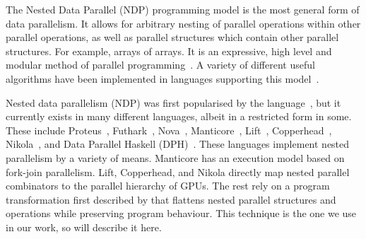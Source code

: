 
The Nested Data Parallel (NDP) programming model is the most general form of data parallelism. It allows for arbitrary nesting of parallel operations within other parallel operations, as well as parallel structures which contain other parallel structures. For example, arrays of arrays. It is an expressive, high level and modular method of parallel programming~\cite{Blelloch:1990vl}. A variety of different useful algorithms have been implemented in languages supporting this model~\cite{Blelloch:nbody94,Blelloch:delaunay96,Blelloch:connected94}.

Nested data parallelism (NDP) was first popularised by the \nesl{} language~\cite{Blelloch:nesl1995}, but it currently exists in many different languages, albeit in a restricted form in some. These include Proteus~\cite{proteus-frontiers95}, Futhark~\cite{Henriksen:2017futhark}, Nova~\cite{collins2013nova}, Manticore~\cite{Fluet:2007:manticore}, Lift~\cite{Steuwer:lift}, Copperhead~\cite{Catanzaro:copperhead}, Nikola~\cite{Mainland:nikola}, and Data Parallel Haskell (DPH)~\cite{Jones:2008uu}. These languages implement nested parallelism by a variety of means. Manticore has an execution model based on fork-join parallelism. Lift, Copperhead, and Nikola directly map nested parallel combinators to the parallel hierarchy of GPUs. The rest rely on a program transformation first described by \citet{Blelloch:compiling1988} that flattens nested parallel structures and operations while preserving program behaviour. This technique is the one we use in our work, so will describe it here.


